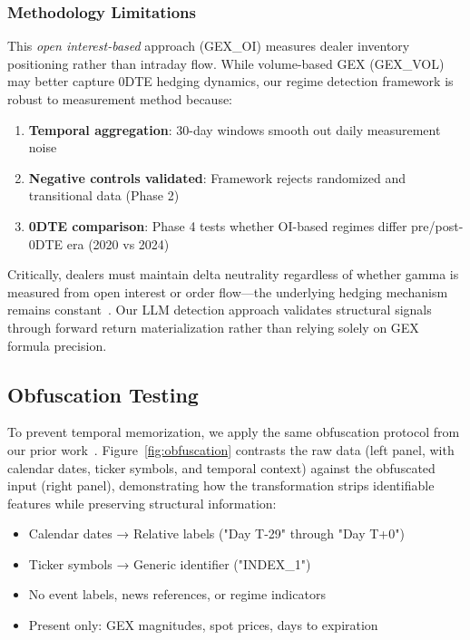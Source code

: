 \subsubsection{Methodology Limitations}

This \textit{open interest-based} approach (GEX\_OI) measures dealer inventory positioning rather than intraday flow. While volume-based GEX (GEX\_VOL) may better capture 0DTE hedging dynamics, our regime detection framework is robust to measurement method because:

\begin{enumerate}
\item \textbf{Temporal aggregation}: 30-day windows smooth out daily measurement noise
\item \textbf{Negative controls validated}: Framework rejects randomized and transitional data (Phase 2)
\item \textbf{0DTE comparison}: Phase 4 tests whether OI-based regimes differ pre/post-0DTE era (2020 vs 2024)
\end{enumerate}

Critically, dealers must maintain delta neutrality regardless of whether gamma is measured from open interest or order flow—the underlying hedging mechanism remains constant~\citep{dim2025zero,ni2005stock}. Our LLM detection approach validates structural signals through forward return materialization rather than relying solely on GEX formula precision.

\subsection{Obfuscation Testing}

To prevent temporal memorization, we apply the same obfuscation protocol from our prior work~\citep{regan2025obfuscation}. Figure~\ref{fig:obfuscation} contrasts the raw data (left panel, with calendar dates, ticker symbols, and temporal context) against the obfuscated input (right panel), demonstrating how the transformation strips identifiable features while preserving structural information:

\begin{itemize}
\item Calendar dates → Relative labels ("Day T-29" through "Day T+0")
\item Ticker symbols → Generic identifier ("INDEX\_1")
\item No event labels, news references, or regime indicators
\item Present only: GEX magnitudes, spot prices, days to expiration
\end{itemize}

